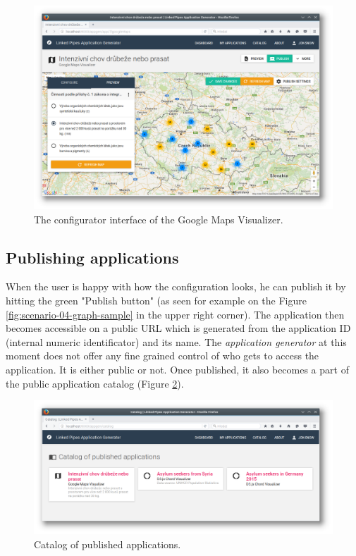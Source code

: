 \begin{figure}
	\centering
	\includegraphics[width=145mm]{img/05_google_maps_visualizer.png}
	\caption{The configurator interface of the Google Maps Visualizer.}
    \label{fig:google_maps_visualizer}
\end{figure}

\subsection{Publishing applications}

When the user is happy with how the configuration looks, he can publish it by hitting the green "Publish button" (as seen for example on the Figure \ref{fig:scenario-04-graph-sample} in the upper right corner). The application then becomes accessible on a public URL which is generated from the application ID (internal numeric identificator) and its name. The \emph{application generator} at this moment does not offer any fine grained control of who gets to access the application. It is either public or not. Once published, it also becomes a part of the public application catalog (Figure \ref{fig:catalog}).

\begin{figure}
	\centering
	\includegraphics[width=145mm]{img/05_catalog}
	\caption{Catalog of published applications.}
    \label{fig:catalog}
\end{figure}

